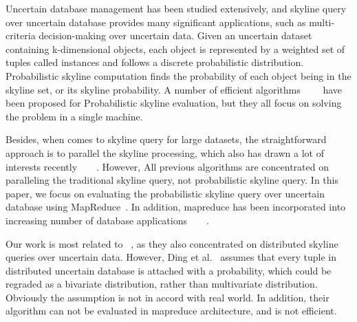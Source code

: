 Uncertain database management has been studied extensively, and skyline query over uncertain database provides many significant applications, such as multi-criteria decision-making over uncertain data. Given an uncertain dataset containing k-dimensional objects, each object is represented by a weighted set of tuples called instances and follows a discrete probabilistic distribution. Probabilistic skyline computation finds the probability of each object being in the skyline set, or its skyline probability. A number of efficient algorithms~\cite{pei2007}~\cite{atallah2009}~\cite{bohm2009}~\cite{kim2011} have been proposed for Probabilistic skyline evaluation, but they all focus on solving the problem in a single machine.

Besides, when comes to skyline query for large datasets, the straightforward approach is to parallel the skyline processing, which also has drawn a lot of interests recently~\cite{ref:SkylineQueries}~\cite{ref:SkylineMulticore}~\cite{ref:SkylineDistributed}~\cite{ref:RandomPartition}. However, All previous algorithms are concentrated on paralleling the traditional skyline query, not probabilistic skyline query. In this paper, we focus on evaluating the probabilistic skyline query over uncertain database using MapReduce~\cite{ref:MapReduce}. In addition, mapreduce has been incorporated into increasing number of database applications~\cite{ref:KNNMapReduce}~\cite{ref:KNNJoin}~\cite{ref:SetSimilarity}~\cite{ref:ThetaJoins}.

Our work is most related to ~\cite{ding2012}, as they also concentrated on distributed skyline queries over uncertain data. However, Ding et al.~\cite{ding2012} assumes that every tuple in distributed uncertain database is attached with a probability, which could be regraded as a bivariate distribution, rather than multivariate distribution. Obviously the assumption is not in accord with real world. In addition, their algorithm can not be evaluated in mapreduce architecture, and is not efficient.


